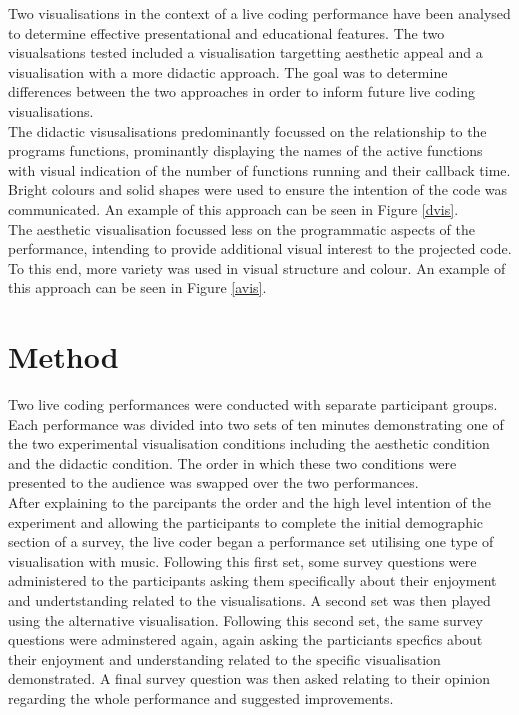 \documentclass{article}
\begin{document}
Two visualisations in the context of a live coding performance have been analysed to determine effective presentational and educational features. The two visualsations tested included a visualisation targetting aesthetic appeal and a visualisation with a more didactic approach. The goal was to determine differences between the two approaches in order to inform future live coding visualisations.\\

The didactic visusalisations predominantly focussed on the relationship to the programs functions, prominantly displaying the names of the active functions with visual indication of the number of functions running and their callback time. Bright colours and solid shapes were used to ensure the intention of the code was communicated. An example of this approach can be seen in Figure \ref{dvis}.\\

The aesthetic visualisation focussed less on the programmatic aspects of the performance, intending to provide additional visual interest to the projected code. To this end, more variety was used in visual structure and colour. An example of this approach can be seen in Figure \ref{avis}.


\section{Method}
Two live coding performances were conducted with separate participant groups. Each performance was divided into two sets of ten minutes demonstrating one of the two experimental visualisation conditions including the aesthetic condition and the didactic condition. The order in which these two conditions were presented to the audience was swapped over the two performances.\\

After explaining to the parcipants the order and the high level intention of the experiment and allowing the participants to complete the initial demographic section of a survey, the live coder began a performance set utilising one type of visualisation with music. Following this first set, some survey questions were administered to the participants asking them specifically about their enjoyment and undertstanding related to the visualisations. A second set was then played using the alternative visualisation. Following this second set, the same survey questions were adminstered again, again asking the particiants specfics about their enjoyment and understanding related to the specific visualisation demonstrated. A final survey question was then asked relating to their opinion regarding the whole performance and suggested improvements.
\end{document}
